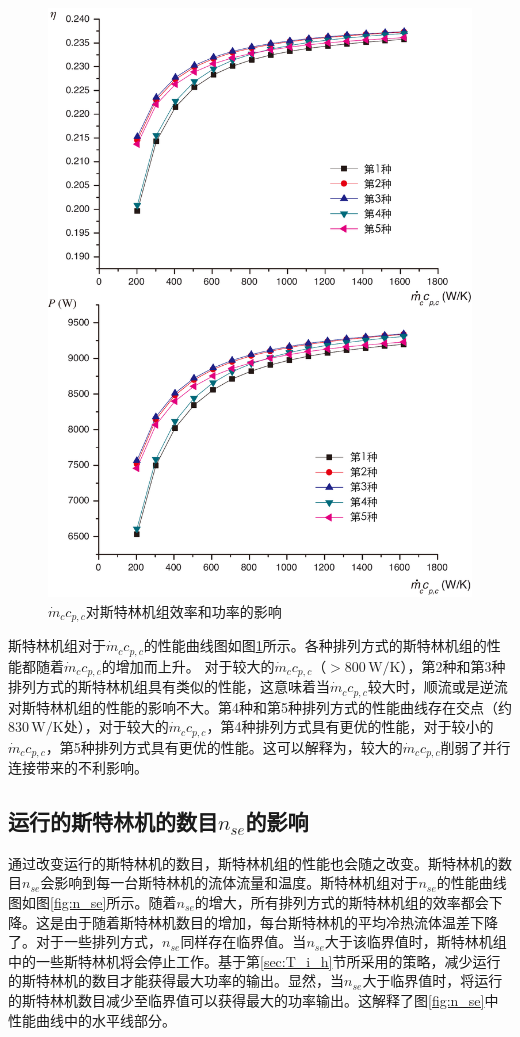 \noindent \begin{figure}[htbp]
\begin{center}
	\includegraphics[width = 0.7\columnwidth]{fig/qm_ccp_c}
	\caption{$\dot{m}_cc_{p,c}$对斯特林机组效率和功率的影响}
	\label{fig:qm_ccp_c}
\end{center}
\end{figure}
斯特林机组对于$\dot{m}_cc_{p,c}$的性能曲线图如图\ref{fig:qm_ccp_c}所示。各种排列方式的斯特林机组的性能都随着$\dot{m}_cc_{p,c}$的增加而上升。
对于较大的$\dot{m}_cc_{p,c}$（$> 800\,\mathrm{W/K}$），第2种和第3种排列方式的斯特林机组具有类似的性能，这意味着当$\dot{m}_cc_{p,c}$较大时，顺流或是逆流对斯特林机组的性能的影响不大。第4种和第5种排列方式的性能曲线存在交点（约$830\,\mathrm{W/K}$处），对于较大的$\dot{m}_cc_{p,c}$，第4种排列方式具有更优的性能，对于较小的$\dot{m}_cc_{p,c}$，第5种排列方式具有更优的性能。这可以解释为，较大的$\dot{m}_cc_{p,c}$削弱了并行连接带来的不利影响。

\subsection{运行的斯特林机的数目$n_{se}$的影响}

通过改变运行的斯特林机的数目，斯特林机组的性能也会随之改变。斯特林机的数目$n_{se}$会影响到每一台斯特林机的流体流量和温度。斯特林机组对于$n_{se}$的性能曲线图如图\ref{fig:n_se}所示。随着$n_{se}$的增大，所有排列方式的斯特林机组的效率都会下降。这是由于随着斯特林机数目的增加，每台斯特林机的平均冷热流体温差下降了。对于一些排列方式，$n_{se}$同样存在临界值。当$n_{se}$大于该临界值时，斯特林机组中的一些斯特林机将会停止工作。基于第\ref{sec:T_i_h}节所采用的策略，减少运行的斯特林机的数目才能获得最大功率的输出。显然，当$n_{se}$大于临界值时，将运行的斯特林机数目减少至临界值可以获得最大的功率输出。这解释了图\ref{fig:n_se}中性能曲线中的水平线部分。

